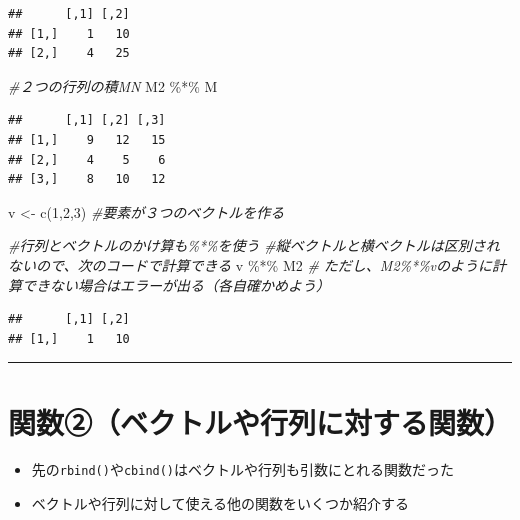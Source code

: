 \documentclass[
]{book}
\newenvironment{Shaded}{\begin{snugshade}}{\end{snugshade}}
\newcommand{\CommentTok}[1]{\textcolor[rgb]{0.56,0.35,0.01}{\textit{#1}}}
\newcommand{\DecValTok}[1]{\textcolor[rgb]{0.00,0.00,0.81}{#1}}
\newcommand{\FunctionTok}[1]{\textcolor[rgb]{0.00,0.00,0.00}{#1}}
\newcommand{\NormalTok}[1]{#1}
\newcommand{\OtherTok}[1]{\textcolor[rgb]{0.56,0.35,0.01}{#1}}
\newcommand{\SpecialCharTok}[1]{\textcolor[rgb]{0.00,0.00,0.00}{#1}}
\providecommand{\tightlist}{%
  \setlength{\itemsep}{0pt}\setlength{\parskip}{0pt}}
\begin{document}
\begin{verbatim}
##      [,1] [,2]
## [1,]    1   10
## [2,]    4   25
\end{verbatim}

\begin{Shaded}
\begin{Highlighting}[]
\CommentTok{\#２つの行列の積MN}
\NormalTok{M2 }\SpecialCharTok{\%*\%}\NormalTok{ M　}
\end{Highlighting}
\end{Shaded}

\begin{verbatim}
##      [,1] [,2] [,3]
## [1,]    9   12   15
## [2,]    4    5    6
## [3,]    8   10   12
\end{verbatim}

\begin{Shaded}
\begin{Highlighting}[]
\NormalTok{v }\OtherTok{\textless{}{-}} \FunctionTok{c}\NormalTok{(}\DecValTok{1}\NormalTok{,}\DecValTok{2}\NormalTok{,}\DecValTok{3}\NormalTok{) }\CommentTok{\#要素が３つのベクトルを作る}

\CommentTok{\#行列とベクトルのかけ算も\%*\%を使う}
\CommentTok{\#縦ベクトルと横ベクトルは区別されないので、次のコードで計算できる}
\NormalTok{v }\SpecialCharTok{\%*\%}\NormalTok{ M2 }\CommentTok{\# ただし、M2\%*\%vのように計算できない場合はエラーが出る（各自確かめよう）}
\end{Highlighting}
\end{Shaded}

\begin{verbatim}
##      [,1] [,2]
## [1,]    1   10
\end{verbatim}

\begin{center}\rule{0.5\linewidth}{0.5pt}\end{center}

\hypertarget{ux95a2ux6570ux2461ux30d9ux30afux30c8ux30ebux3084ux884cux5217ux306bux5bfeux3059ux308bux95a2ux6570}{%
\section{関数②（ベクトルや行列に対する関数）}\label{ux95a2ux6570ux2461ux30d9ux30afux30c8ux30ebux3084ux884cux5217ux306bux5bfeux3059ux308bux95a2ux6570}}

\begin{itemize}
\tightlist
\item
  先の\texttt{rbind()}や\texttt{cbind()}はベクトルや行列も引数にとれる関数だった
\item
  ベクトルや行列に対して使える他の関数をいくつか紹介する
\end{itemize}
\end{document}
